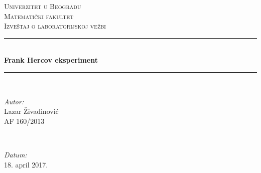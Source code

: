 \documentclass[12pt,a4paper]{article}
\begin{document}
\begin{titlepage}

\newcommand{\HRule}{\rule{\linewidth}{0.5mm}} %

\center %
 

\textsc{\LARGE Univerzitet u Beogradu\\ Matematički fakultet}\\[1.5cm] %
\textsc{\Large Izveštaj o laboratorijskoj vežbi}\\[0.5cm] %


\HRule \\[0.4cm]
{ \huge \bfseries Frank Hercov eksperiment}\\[0.4cm] %
\HRule \\[1.5cm]
 
\vspace{12cm}
\begin{minipage}{0.4\textwidth}
\begin{flushleft} \large
\emph{Autor:}\\
Lazar Živadinović \\
AF 160/2013 
\end{flushleft}
\end{minipage}
~
\begin{minipage}{0.4\textwidth}
\begin{flushright} \large
\emph{Datum:} \\
18. april 2017.
\end{flushright}
\end{minipage}\\[2cm]


\end{titlepage}
\end{document}
